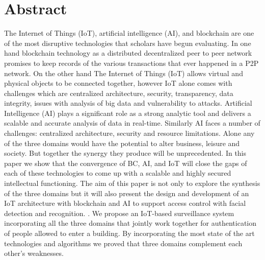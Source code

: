 \chapter*{Abstract}



The Internet of Things (IoT), artificial
intelligence (AI), and blockchain are one of the most disruptive technologies that scholars have begun evaluating. In one hand blockchain technology as a distributed  decentralized peer to peer network promises to keep  records of the various transactions that ever happened in a P2P network. On the other hand The Internet of Things (IoT) allows virtual and physical objects to be connected together, however IoT alone comes with challenges which are centralized architecture, security, transparency, data integrity, issues with analysis of big data and vulnerability to attacks. Artificial Intelligence (AI) plays a significant role as a strong analytic tool and delivers a scalable and accurate analysis of data in real-time. Similarly AI faces a number of challenges: centralized architecture, security and resource limitations. Alone any of the three domains would have the potential to alter business, leisure and society. But together the synergy they produce will be unprecedented. 
In this paper we show that the convergence of BC, AI, and IoT will close the gaps of each of these technologies to come up with a scalable and highly secured intellectual functioning. The aim of this paper is not only to  explore the synthesis of the three domains but it will also present the design and development of an IoT architecture with blockchain and AI to support access control with facial detection and recognition. . We propose an IoT-based surveillance system incorporating all the three domains that jointly work together for authentication of people allowed to enter a building.  By incorporating the most state of the art technologies and algorithms we proved that three domains complement each other's weaknesses. 


\newpage






